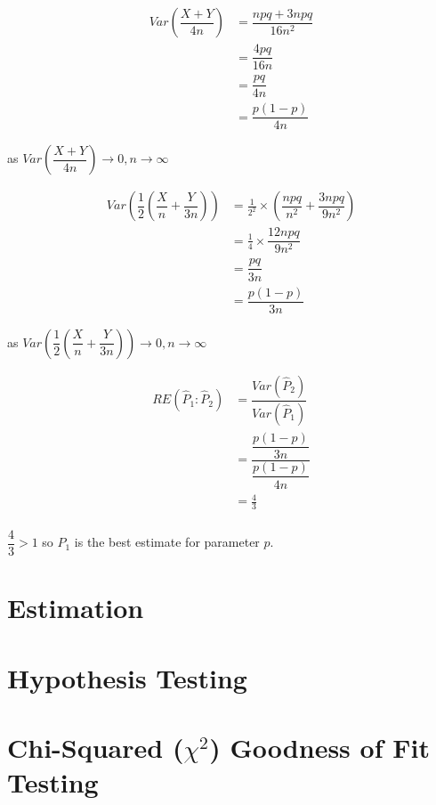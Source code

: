 \begin{example}
\begin{step}
    \begin{align*}
        Var\left(\dfrac{X + Y}{4n}\right) &= \dfrac{npq + 3npq}{16n^2}      \\
        &= \dfrac{4pq}{16n}                                                 \\
        &= \dfrac{pq}{4n}                                                   \\
        &= \dfrac{p(1-p)}{4n}
    \end{align*}

    \begin{center}
    as $Var\left(\dfrac{X + Y}{4n}\right) \rightarrow 0, n \rightarrow \infty$
    \end{center}

    \begin{align*}
        Var\left(\dfrac{1}{2}\left(\dfrac{X}{n} + \dfrac{Y}{3n}\right)\right) &= \frac{1}{2^2} \times \left(\dfrac{npq}{n^2}+\dfrac{3npq}{9n^2}\right)        \\
        &= \frac{1}{4} \times \dfrac{12npq}{9n^2}   \\
        &= \dfrac{pq}{3n}                           \\
        &= \dfrac{p(1-p)}{3n}
    \end{align*}

    \begin{center}
    as $Var\left(\dfrac{1}{2}\left(\dfrac{X}{n} + \dfrac{Y}{3n}\right)\right) \rightarrow 0, n \rightarrow \infty$
    \end{center}

    \begin{align*}
    RE(\hat{P}_1 : \hat{P}_2) &= \dfrac{Var(\hat{P}_2)}{Var(\hat{P}_1)}  \\
    &= \dfrac{\dfrac{p(1-p)}{3n}}{\dfrac{p(1-p)}{4n}}                               \\
    &= \frac{4}{3}                                                                  \\
    \end{align*}

    $\dfrac{4}{3} > 1$ so $\hat{P}_1$ is the best estimate for parameter $p$.

    \end{step}

    \end{example}

\section{Estimation}
\section{Hypothesis Testing}
\section{Chi-Squared ($\chi^2$) Goodness of Fit Testing}
